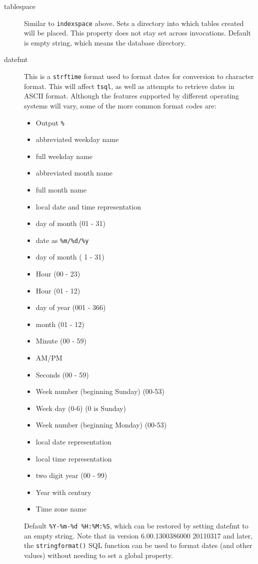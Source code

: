 \begin{description}
\item[tablespace] Similar to \verb`indexspace` above.  Sets a
directory into which tables created will be placed.  This property
does not stay set across invocations.  Default is empty string, which
means the database directory.

\item[datefmt] This is a \verb`strftime` format used to format dates
for conversion to character format.  This will affect \verb`tsql`, as
well as attempts to retrieve dates in ASCII format.  Although the
features supported by different operating systems will vary, some of
the more common format codes are:

\begin{itemize}
\item[\verb`\%\%`] Output \verb`%`
\item[\verb`\%a`] abbreviated weekday name
\item[\verb`\%A`] full weekday name
\item[\verb`\%b`] abbreviated month name
\item[\verb`\%B`] full month name
\item[\verb`\%c`] local date and time representation
\item[\verb`\%d`] day of month (01 - 31)
\item[\verb`\%D`] date as \verb`%m/%d/%y`
\item[\verb`\%e`] day of month ( 1 - 31)
\item[\verb`\%H`] Hour (00 - 23)
\item[\verb`\%I`] Hour (01 - 12)
\item[\verb`\%j`] day of year (001 - 366)
\item[\verb`\%m`] month (01 - 12)
\item[\verb`\%M`] Minute (00 - 59)
\item[\verb`\%p`] AM/PM
\item[\verb`\%S`] Seconds (00 - 59)
\item[\verb`\%U`] Week number (beginning Sunday) (00-53)
\item[\verb`\%w`] Week day (0-6) (0 is Sunday)
\item[\verb`\%W`] Week number (beginning Monday) (00-53)
\item[\verb`\%x`] local date representation
\item[\verb`\%X`] local time representation
\item[\verb`\%y`] two digit year (00 - 99)
\item[\verb`\%Y`] Year with century
\item[\verb`\%Z`] Time zone name
\end{itemize}
Default \verb`%Y-%m-%d %H:%M:%S`, which can be
restored by setting datefmt to an empty string.
Note that in version 6.00.1300386000 20110317 and later, the
\verb`stringformat()` SQL function can be used to format dates
(and other values) without needing to set a global property.


\end{description}
